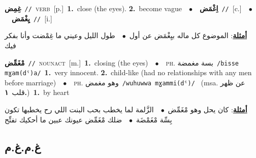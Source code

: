 \documentclass[10pt,a4paper,twoside]{article} %
\begin{document}
\begin{multicols}{2}
{\setlength\topsep{0pt}\textbf{\foreignlanguage{arabic}{غِمِض}}\ {\color{gray}\texttt{//}\color{black}}\ \textsc{verb}\ [p.]\ \textbf{1.}~close (the eyes).  \textbf{2.}~become vague\ \ $\bullet$\ \ \setlength\topsep{0pt}\textbf{\foreignlanguage{arabic}{اِغْمَض}}\ {\color{gray}\texttt{//}\color{black}}\ [c.]\ \ $\bullet$\ \ \setlength\topsep{0pt}\textbf{\foreignlanguage{arabic}{يِغْمَض}}\ {\color{gray}\texttt{//}\color{black}}\ [i.]\  \begin{flushright}\color{gray}\foreignlanguage{arabic}{\textbf{\underline{\foreignlanguage{arabic}{أمثلة}}}: الموضوع كل ماله بيِغْمَض عن أول\ $\bullet$\ \  طول الليل وعيني ما غِمْضت وأنا بفكر فيك}\end{flushright}\color{black}} \vspace{2mm}

{\setlength\topsep{0pt}\textbf{\foreignlanguage{arabic}{مْغَمِّض}}\ {\color{gray}\texttt{//}\color{black}}\ \textsc{noun\textunderscore act}\ [m.]\ \textbf{1.}~closing (the eyes)\ \ $\bullet$\ \ \textsc{ph.} \color{gray} \foreignlanguage{arabic}{بسة مغمضة}\color{black}\ {\color{gray}\texttt{/{\sffamily bisse mɣam(dˤ)a}/}\color{black}}\ \textbf{1.}~very innocent.  \textbf{2.}~child-like (had no relationships with any men before marriage)\ \ $\bullet$\ \ \textsc{ph.} \color{gray} \foreignlanguage{arabic}{وهو مغمض}\color{black}\ {\color{gray}\texttt{/{\sffamily wuhuwwa mɣammi(dˤ)}/}\color{black}}\ \color{gray} (msa. \foreignlanguage{arabic}{عن ظهر قلب}~\foreignlanguage{arabic}{\textbf{١.}})\color{black}\ \textbf{1.}~by heart\  \begin{flushright}\color{gray}\foreignlanguage{arabic}{\textbf{\underline{\foreignlanguage{arabic}{أمثلة}}}: كان يحل وهو مْغَمِّض\ $\bullet$\ \  الزَّلمة لما يخطب بحب البنت اللي رح يخطبها تكون بِسِّة مْغَمْضَة\ $\bullet$\ \  ضلك مْغَمِّض عيونك عبين ما أحكيك تفتِّح}\end{flushright}\color{black}} \vspace{2mm}

\vspace{-3mm}
\subsection*{\color{blue}\foreignlanguage{arabic}{غ.م.غ.م}\color{blue}{}} 


\end{multicols}
\end{document}
